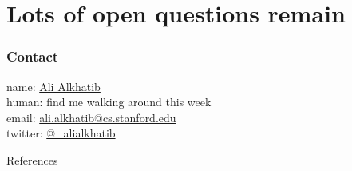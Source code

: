 \documentclass{beamer}
\begin{document}
\section{Lots of open questions remain}


\begin{frame}
  \frametitle{Contact}
    name: \href{https://ali-alkhatib.com}{Ali Alkhatib} \\
    human: find me walking around this week \\
    email: \href{mailto:ali.alkhatib@cs.stanford.edu}{ali.alkhatib@cs.stanford.edu} \\
    twitter: \href{https://twitter.com/_alialkhatib}{@\_alialkhatib} \\
\end{frame}


\begin{frame}[allowframebreaks]{References}
  
  
\end{frame}
\end{document}
